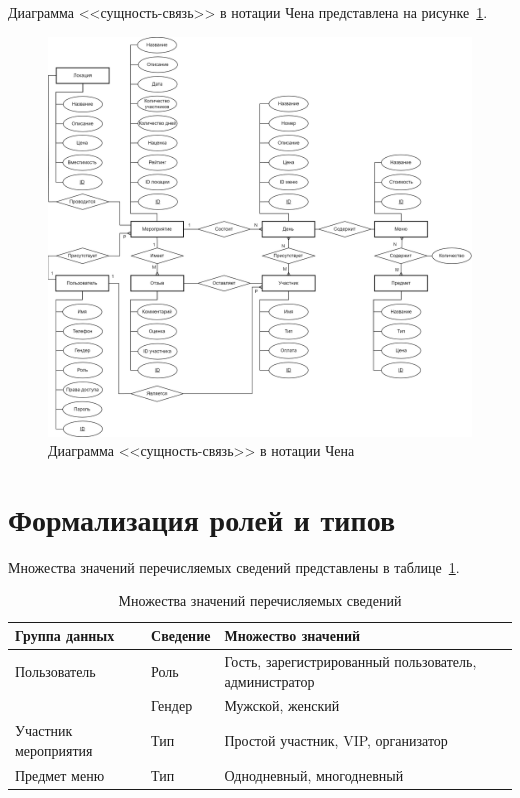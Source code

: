\newpage

Диаграмма <<сущность-связь>> в нотации Чена представлена на рисунке~\ref{fig:er-diagram}.

\begin{figure}[h]
	\centering
	\includegraphics[width=1\textwidth]{images/er-diagram.png}
	\caption{Диаграмма <<сущность-связь>> в нотации Чена } 
	\label{fig:er-diagram} 
\end{figure}

\newpage

\section{Формализация ролей и типов}

Множества значений перечисляемых сведений представлены в таблице~\ref{tbl:data-groups-types}.

\begin{table}[h]
	\centering
	\caption{Множества значений перечисляемых сведений}
	\begin{tabularx}{\textwidth}{|p{5cm}|p{2cm}|X|}
		\hline
		\textbf{Группа данных} & \textbf{Сведение} & \textbf{Множество значений} \\
		\hline
		Пользователь & Роль & Гость, зарегистрированный пользователь, администратор \\
		\cline{2-3}
		& Гендер & Мужской, женский \\
		\hline
		Участник мероприятия & Тип & Простой участник, VIP, организатор \\
		\hline
		Предмет меню & Тип & Однодневный, многодневный \\
		\hline
	\end{tabularx}
	\label{tbl:data-groups-types}
\end{table}



